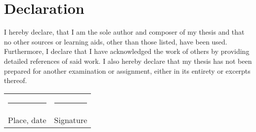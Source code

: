 \chapter*{Declaration}
I hereby declare, that I am the sole author and composer of my thesis and that no
other sources or learning aids, other than those listed, have been used. Furthermore,
I declare that I have acknowledged the work of others by providing detailed
references of said work.
I also hereby declare that my thesis has not been prepared for another examination
or assignment, either in its entirety or excerpts thereof.
\\[3\normalbaselineskip]
\begin{tabular}{p{} l}
  \rule{\textwidth/3}{0.4pt}  & \rule{\textwidth/3}{0.4pt} \\
  Place, date                  & Signature
\end{tabular}